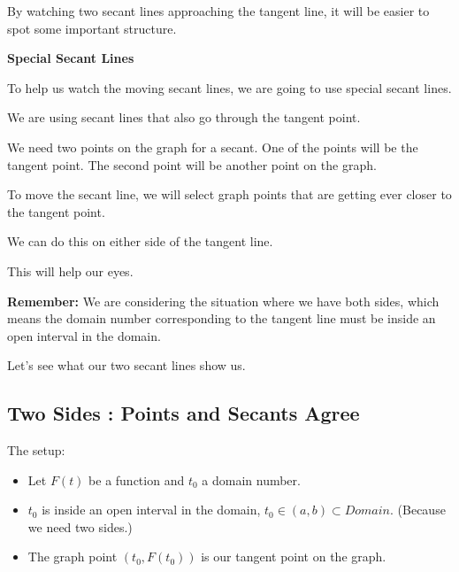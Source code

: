\documentclass{ximera}
\begin{document}
By watching two secant lines approaching the tangent line, it will be easier to spot some important structure. 






\begin{idea}   \textbf{\textcolor{blue!55!black}{Special Secant Lines}}


To help us watch the moving secant lines, we are going to use special secant lines. 

We are using secant lines that also go through the tangent point. 

We need two points on the graph for a secant. One of the points will be the tangent point.  The second point will be another point on the graph. 

To move the secant line, we will select graph points that are getting ever closer to the tangent point. 

We can do this on either side of the tangent line. 

This will help our eyes.


\end{idea}


\textbf{Remember:} We are considering the situation where we have both sides, which means the domain number corresponding to the tangent line must be inside an open interval in the domain. 






Let's see what our two secant lines show us.


















\subsection*{Two Sides : Points and Secants Agree}


The setup: 

\begin{itemize}
     \item Let $F(t)$ be a function and $t_0$ a domain number. 

     \item $t_0$ is inside an open interval in the domain, $t_0 \in (a, b) \subset Domain$. (Because we need two sides.) 

     \item The graph point $(t_0 , F(t_0))$ is our tangent point on the graph.
\end{itemize}
\end{document}

